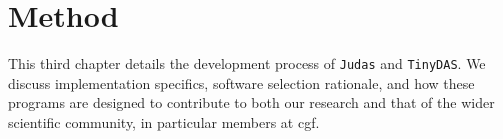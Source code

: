 \chapter{Method}
\label{chap:method}

This third chapter details the development process of \texttt{Judas} and \texttt{TinyDAS}. We discuss implementation specifics, software selection rationale, and how these programs are designed to contribute to both our research and that of the wider scientific community, in particular members at \acrshort{cgf}.





% 



